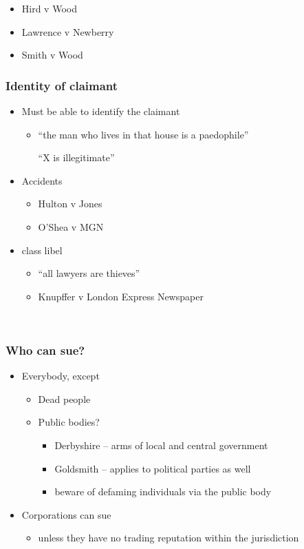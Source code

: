 \documentclass[ignorenonframetext,]{beamer}
\begin{document}
  \begin{itemize}
  \item    Hird v Wood
  \item    Lawrence v Newberry
  \item    Smith v Wood
  \end{itemize}


\begin{frame}
\frametitle{Identity of claimant}

\begin{itemize}
\item  Must be able to identify the claimant

  \begin{itemize}
  \item    ``the man who lives in that house is a paedophile''

    ``X is illegitimate''
  \end{itemize}
\item  Accidents

  \begin{itemize}
  \item    Hulton v Jones 
  \item    O'Shea v MGN
  \end{itemize}
\item  class libel 

  \begin{itemize}
  \item    ``all lawyers are thieves''
  \item    Knupffer v London Express Newspaper
  \end{itemize}
\end{itemize}

~


\end{frame}

\begin{frame}
\frametitle{Who can sue?}

\begin{itemize}
\item  Everybody, except

  \begin{itemize}
  \item    Dead people
  \item    Public bodies?

    \begin{itemize}
    \item {Derbyshire}{ -- arms of local and central government}
    \item {Goldsmith}{ -- applies to political parties as well}
    \item {beware of defaming individuals via the public body}
    \end{itemize}
  \end{itemize}
\item  {Corporations can sue}

  \begin{itemize}
  \item    {unless they have no trading reputation within the
    jurisdiction}
  \end{itemize}
\end{itemize}
\end{frame}
\end{document}
